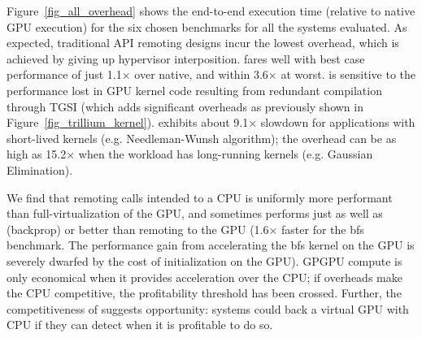 Figure~\ref{fig_all_overhead} shows the end-to-end execution time (relative to
native GPU execution) for the six chosen benchmarks for all the systems evaluated. As
expected, traditional API remoting designs incur the lowest overhead, which is
achieved by giving up hypervisor interposition.
\trillium fares well with best case performance
of just 1.1$\times$ over native, and within 3.6$\times$ at worst. \trxc is
sensitive to the performance lost in GPU kernel code resulting from redundant
compilation through TGSI (which adds significant overheads as previously shown in
Figure~\ref{fig_trillium_kernel}). \gpuvmopt exhibits about 9.1$\times$ slowdown for
applications with short-lived kernels (e.g. Needleman-Wunsh algorithm); the
overhead can be as high as 15.2$\times$ when the workload has long-running
kernels (e.g. Gaussian Elimination).

We find that remoting calls intended to a CPU is uniformly more
performant than full-virtualization of the GPU, and sometimes performs just as well as (backprop)
or better than remoting to the GPU (1.6$\times$ faster for the bfs benchmark. The performance gain
from accelerating the bfs kernel on the GPU is severely dwarfed by the cost of initialization on
the GPU).
GPGPU compute is only economical when it provides acceleration over the CPU;
if overheads make the CPU competitive, the profitability threshold has been crossed.
Further, the competitiveness of \apicpu suggests opportunity: systems could back a virtual
GPU with CPU if they can detect when it is profitable to do so.


